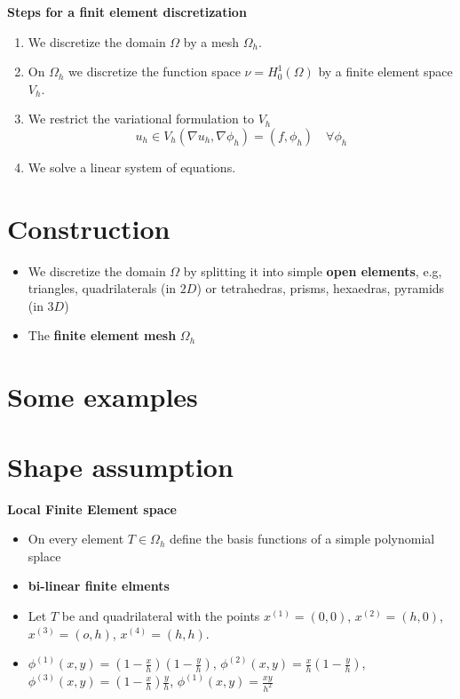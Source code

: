 \documentclass[openany]{memoir}
\theoremstyle{defintion}
\begin{document}
\textbf{Steps for a finit element discretization}

\begin{enumerate}
\item We discretize the domain $\Omega$ by a mesh $\Omega_h$.
\item On $\Omega_h$ we discretize the function space $\nu=H^1_0(\Omega)$ by a finite element space $V_h$.
\item We restrict the variational formulation to $V_h$ \[u_h\in V_h (\nabla u_h,\nabla \phi_h)=(f,\phi_h)\quad\forall \phi_h \]
\item We solve a linear system of equations.
\end{enumerate}

\section{Construction}

\begin{itemize}
\item We discretize the domain $\Omega$ by splitting it into simple \textbf{open elements}, e.g, triangles, quadrilaterals (in $2D$) or tetrahedras, prisms, hexaedras, pyramids (in $3D$)
\item The \textbf{finite element mesh} $\Omega_h$
\end{itemize}

\section{Some examples}

\section{Shape assumption}

\textbf{Local Finite Element space}

\begin{itemize}
\item On every element $T\in\Omega_h$ define the basis functions of a simple polynomial splace
\item \textbf{bi-linear finite elments}
\item Let $T$ be and quadrilateral with the points $x^{(1)}=(0,0)$, $x^{(2)}=(h,0)$, $x^{(3)}=(o,h)$, $x^{(4)}=(h,h)$.
\item $\phi^{(1)}(x,y)=(1-\frac{x}{h})(1-\frac{y}{h})$, $\phi^{(2)}(x,y)=\frac{x}{h}(1-\frac{y}{h})$, $\phi^{(3)}(x,y)=(1-\frac{x}{h})\frac{y}{h}$, $\phi^{(1)}(x,y)=\frac{xy}{h^2}$
\end{itemize}
\end{document}
